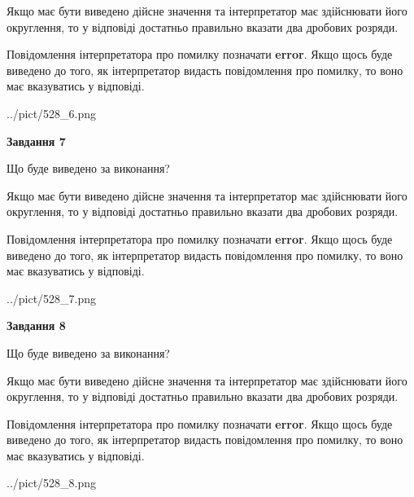 \documentclass[12pt, ukrainian]{article}
\begin{document}
{\begin {Large}
Якщо має бути виведено дійсне значення та інтерпретатор має здійснювати його округлення, 
то у відповіді достатньо правильно вказати два дробових розряди.

Повідомлення інтерпретатора про помилку позначати \textbf{error}.
Якщо щось буде виведено до того, як інтерпретатор видасть повідомлення про помилку, 
то воно має вказуватись у відповіді. \par

\begin{center}
	{../pict/528_6.png}
\end{center}
\newpage

{\begin {center}\textbf{Завдання 7}\end {center}}\par
Що буде виведено за виконання? \par

Якщо має бути виведено дійсне значення та інтерпретатор має здійснювати його округлення, 
то у відповіді достатньо правильно вказати два дробових розряди.

Повідомлення інтерпретатора про помилку позначати \textbf{error}.
Якщо щось буде виведено до того, як інтерпретатор видасть повідомлення про помилку, 
то воно має вказуватись у відповіді. \par

\begin{center}
	{../pict/528_7.png}
\end{center}
\newpage

{\begin {center}\textbf{Завдання 8}\end {center}}\par
Що буде виведено за виконання? \par

Якщо має бути виведено дійсне значення та інтерпретатор має здійснювати його округлення, 
то у відповіді достатньо правильно вказати два дробових розряди.

Повідомлення інтерпретатора про помилку позначати \textbf{error}.
Якщо щось буде виведено до того, як інтерпретатор видасть повідомлення про помилку, 
то воно має вказуватись у відповіді. \par

\begin{center}
	{../pict/528_8.png}
\end{center}
\newpage


\end{Large}}
\end{document}
